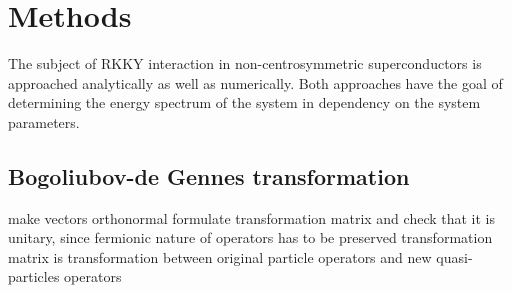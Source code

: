 \section{Methods}
The subject of RKKY interaction in non-centrosymmetric superconductors is approached analytically as well as numerically. 
Both approaches have the goal of determining the energy spectrum of the system in dependency on the system parameters.

\subsection{Bogoliubov-de Gennes transformation}\label{sec:BdG}
make vectors orthonormal \newline
formulate transformation matrix and check that it is unitary, since fermionic nature of operators has to be preserved \newline
transformation matrix is transformation between original particle operators and new quasi-particles operators \newline

